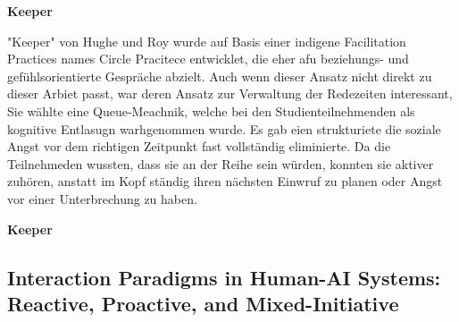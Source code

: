 \textbf{Keeper}

"Keeper" von Hughe und Roy wurde auf Basis einer indigene Facilitation Practices names Circle Pracitece
entwicklet, die eher afu beziehungs- und gefühlsorientierte Gespräche abzielt. Auch wenn dieser Ansatz nicht
direkt zu dieser Arbiet passt, war deren Ansatz zur Verwaltung der Redezeiten interessant, Sie wählte eine
Queue-Meachnik, welche bei den Studienteilnehmenden als kognitive Entlasugn warhgenommen wurde. Es gab eien
strukturiete die soziale Angst vor dem richtigen Zeitpunkt fast vollständig eliminierte. Da die Teilnehmeden
wussten, dass sie an der Reihe sein würden, konnten sie aktiver zuhören, anstatt im Kopf ständig ihren
nächsten Einwruf zu planen oder Angst vor einer Unterbrechung zu haben.

\textbf{Keeper}

\subsection{Interaction Paradigms in Human-AI Systems: Reactive, Proactive, and Mixed-Initiative}
\label{sec:interaction-paradigms}






